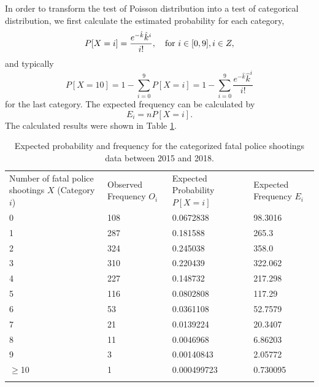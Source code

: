 \documentclass[conf]{new-aiaa}
\begin{document}
In order to transform the test of Poisson distribution into a test of categorical distribution, we first calculate the estimated probability for each category,
$$P[X=i]=\frac{e^{-\hat{k}}\hat{k}^i}{i!},\quad{\rm for\ }i\in[0,9],i\in Z,$$
and typically
$$P[X=10]=1-\sum_{i=0}^9P[X=i]=1-\sum_{i=0}^9\frac{e^{-\hat{k}}\hat{k}^i}{i!}$$
for the last category. The expected frequency can be calculated by
$$E_i=nP[X=i].$$
The calculated results were shown in Table \ref{tab:q3-all-exp}. \medskip

\begin{table}[!htbp]
\centering
\begin{tabular}{m{3cm}<{\centering}m{3cm}<{\centering}m{3cm}<{\centering}m{3cm}<{\centering}}
\toprule 
\toprule
Number of fatal police shootings $X$ (Category $i$)
 & Observed Frequency $O_i$ 
& Expected Probability $P[X=i]$ & Expected Frequency $E_i$ \\
\noalign{\smallskip}\hline\noalign{\smallskip}
0  &   108   & 0.0672838  & 98.3016\\
1  &   287   & 0.181588   & 265.3\\
2  &   324   & 0.245038   & 358.0\\
3  &   310   & 0.220439   & 322.062\\
4  &   227   & 0.148732   & 217.298\\
5  &   116   & 0.0802808  & 117.29\\
6  &   53    & 0.0361108  & 52.7579\\
7  &   21    & 0.0139224  & 20.3407\\
8  &   11    & 0.0046968  & 6.86203\\
9  &   3     & 0.00140843 & 2.05772\\
$\geqslant$10 &   1     & 0.000499723& 0.730095\\
\bottomrule 
\bottomrule  \smallskip
\end{tabular}
\caption{Expected probability and frequency for the categorized fatal police shootings data between 2015 and 2018.}
\label{tab:q3-all-exp}
\end{table}
\end{document}
